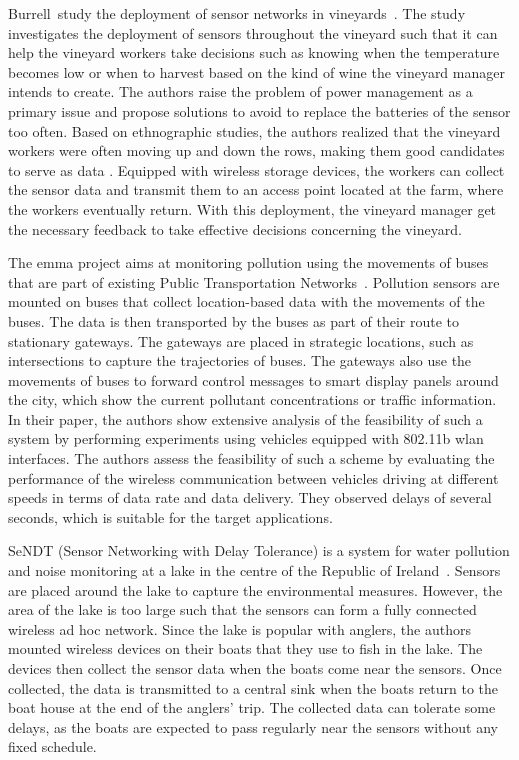 Burrell~\etal study the deployment of sensor networks in vineyards~\cite{burrell2004vineyard}. The study investigates the deployment of sensors throughout the vineyard such that it can help the vineyard workers take decisions such as knowing when the temperature becomes low or when to harvest based on the kind of wine the vineyard manager intends to create. The authors raise the problem of power management as a primary issue and propose solutions to avoid to replace the batteries of the sensor too often. Based on ethnographic studies, the authors realized that the vineyard workers were often moving up and down the rows, making them good candidates to serve as data . Equipped with wireless storage devices, the workers can collect the sensor data and transmit them to an access point located at the farm, where the workers eventually return. With this deployment, the vineyard manager get the necessary feedback to take effective decisions concerning the vineyard.

The \acrfull{emma} project aims at monitoring pollution using the movements of buses that are part of existing Public Transportation Networks~\cite{lahde2007practical}. Pollution sensors are mounted on buses that collect location-based data with the movements of the buses. The data is then transported by the buses as part of their route to stationary gateways. The gateways are placed in strategic locations, such as intersections to capture the trajectories of buses. The gateways also use the movements of buses to forward control messages to smart display panels around the city, which show the current pollutant concentrations or traffic information. In their paper, the authors show extensive analysis of the feasibility of such a system by performing experiments using vehicles equipped with 802.11b \acrshort{wlan} interfaces. The authors assess the feasibility of such a scheme by evaluating the performance of the wireless communication between vehicles driving at different speeds in terms of data rate and data delivery. They observed delays of several seconds, which is suitable for the target applications.

SeNDT (Sensor Networking with Delay Tolerance) is a system for water pollution and noise monitoring at a lake in the centre of the Republic of Ireland~\cite{mcdonald2007sensor}. Sensors are placed around the lake to capture the environmental measures. However, the area of the lake is too large such that the sensors can form a fully connected wireless ad hoc network. Since the lake is popular with anglers, the authors mounted wireless devices on their boats that they use to fish in the lake. The devices then collect the sensor data when the boats come near the sensors. Once collected, the data is transmitted to a central sink when the boats return to the boat house at the end of the anglers' trip. The collected data can tolerate some delays, as the boats are expected to pass regularly near the sensors without any fixed schedule.


